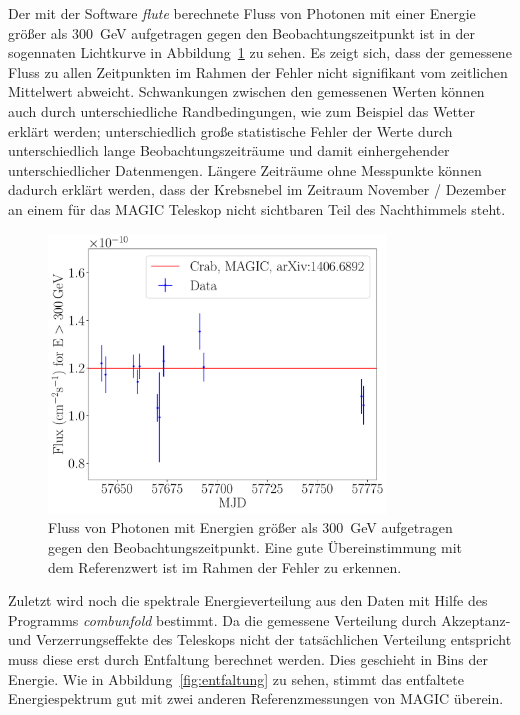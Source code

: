 Der mit der Software \textit{flute} berechnete Fluss von Photonen mit einer
Energie größer als \SI{300}{\giga\electronvolt} aufgetragen gegen den
Beobachtungszeitpunkt ist in der sogennaten Lichtkurve in
Abbildung~\ref{fig:lichtkurve} zu sehen. Es zeigt sich, dass der gemessene Fluss
zu allen Zeitpunkten im Rahmen der Fehler nicht signifikant vom zeitlichen
Mittelwert abweicht. Schwankungen zwischen den gemessenen Werten können
auch durch unterschiedliche Randbedingungen, wie zum Beispiel das Wetter erklärt
werden; unterschiedlich große statistische Fehler der Werte durch
unterschiedlich lange Beobachtungszeiträume und damit einhergehender
unterschiedlicher Datenmengen. Längere Zeiträume ohne Messpunkte können dadurch
erklärt werden, dass der Krebsnebel im Zeitraum November / Dezember an einem für
das MAGIC Teleskop nicht sichtbaren Teil des Nachthimmels steht.

\begin{figure}
  \centering
  \includegraphics[width=0.8\textwidth]{figures/flute_lichtkurve.pdf}
  \caption{Fluss von Photonen mit Energien größer als
  \SI{300}{\giga\electronvolt} aufgetragen gegen den Beobachtungszeitpunkt. Eine
  gute Übereinstimmung mit dem Referenzwert ist im Rahmen der Fehler zu
  erkennen.}
  \label{fig:lichtkurve}
\end{figure}

Zuletzt wird noch die spektrale Energieverteilung aus den Daten mit Hilfe des
Programms \textit{combunfold} bestimmt. Da die gemessene Verteilung durch
Akzeptanz- und Verzerrungseffekte des Teleskops nicht der tatsächlichen
Verteilung entspricht muss diese erst durch Entfaltung berechnet werden. Dies
geschieht in Bins der Energie. Wie in Abbildung~\ref{fig:entfaltung} zu sehen,
stimmt das entfaltete Energiespektrum gut mit zwei anderen Referenzmessungen von
MAGIC überein.

